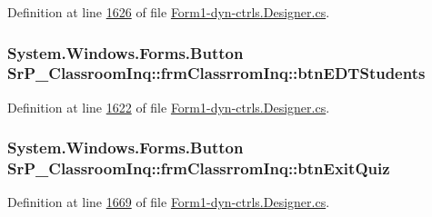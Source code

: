 \-Definition at line \hyperlink{_form1-dyn-ctrls_8_designer_8cs_source_l01626}{1626} of file \hyperlink{_form1-dyn-ctrls_8_designer_8cs_source}{\-Form1-\/dyn-\/ctrls.\-Designer.\-cs}.

\hypertarget{class_sr_p___classroom_inq_1_1frm_classrrom_inq_a527ceba70a2003fe9550f3fb3e307999}{
\subsubsection[{btn\-E\-D\-T\-Students}]{\setlength{\rightskip}{0pt plus 5cm}\-System.\-Windows.\-Forms.\-Button {\bf \-Sr\-P\-\_\-\-Classroom\-Inq\-::frm\-Classrrom\-Inq\-::btn\-E\-D\-T\-Students}}}
\label{class_sr_p___classroom_inq_1_1frm_classrrom_inq_a527ceba70a2003fe9550f3fb3e307999}


\-Definition at line \hyperlink{_form1-dyn-ctrls_8_designer_8cs_source_l01622}{1622} of file \hyperlink{_form1-dyn-ctrls_8_designer_8cs_source}{\-Form1-\/dyn-\/ctrls.\-Designer.\-cs}.

\hypertarget{class_sr_p___classroom_inq_1_1frm_classrrom_inq_a207f1be65a3e42071f8375603e4b854c}{
\subsubsection[{btn\-Exit\-Quiz}]{\setlength{\rightskip}{0pt plus 5cm}\-System.\-Windows.\-Forms.\-Button {\bf \-Sr\-P\-\_\-\-Classroom\-Inq\-::frm\-Classrrom\-Inq\-::btn\-Exit\-Quiz}}}
\label{class_sr_p___classroom_inq_1_1frm_classrrom_inq_a207f1be65a3e42071f8375603e4b854c}


\-Definition at line \hyperlink{_form1-dyn-ctrls_8_designer_8cs_source_l01669}{1669} of file \hyperlink{_form1-dyn-ctrls_8_designer_8cs_source}{\-Form1-\/dyn-\/ctrls.\-Designer.\-cs}.

